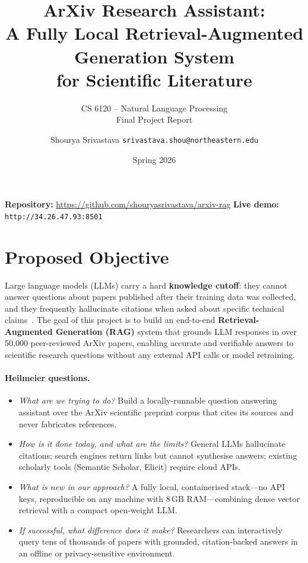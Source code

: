 \documentclass[paper=a4, fontsize=11pt]{scrartcl}
\title{ArXiv Research Assistant:\\
       A Fully Local Retrieval-Augmented Generation System\\
       for Scientific Literature}
\subtitle{CS 6120 -- Natural Language Processing \\ Final Project Report}
\author{Shourya Srivastava \quad \texttt{srivastava.shou@northeastern.edu}}
\date{Spring 2026}
\begin{document}
\maketitle

\noindent
\textbf{Repository:} \url{https://github.com/shouryasrivastava/arxiv-rag} \hfill
\textbf{Live demo:} \texttt{http://34.26.47.93:8501}

\medskip

\section{Proposed Objective}

Large language models (LLMs) carry a hard \textbf{knowledge cutoff}: they
cannot answer questions about papers published after their training data was
collected, and they frequently hallucinate citations when asked about specific
technical claims~\citep{hallucination2023}.
The goal of this project is to build an end-to-end
\textbf{Retrieval-Augmented Generation (RAG)} system that grounds LLM responses
in over 50{,}000 peer-reviewed ArXiv papers, enabling accurate and verifiable
answers to scientific research questions without any external API calls or model
retraining.

\paragraph{Heilmeier questions.}
\begin{itemize}
  \item \textit{What are we trying to do?} Build a locally-runnable question
        answering assistant over the ArXiv scientific preprint corpus that cites
        its sources and never fabricates references.
  \item \textit{How is it done today, and what are the limits?} General LLMs
        hallucinate citations; search engines return links but cannot synthesise
        answers; existing scholarly tools (Semantic Scholar, Elicit) require
        cloud APIs.
  \item \textit{What is new in our approach?} A fully local, containerised
        stack---no API keys, reproducible on any machine with 8\,GB RAM---combining
        dense vector retrieval with a compact open-weight LLM.
  \item \textit{If successful, what difference does it make?} Researchers can
        interactively query tens of thousands of papers with grounded,
        citation-backed answers in an offline or privacy-sensitive environment.
\end{itemize}
\end{document}
